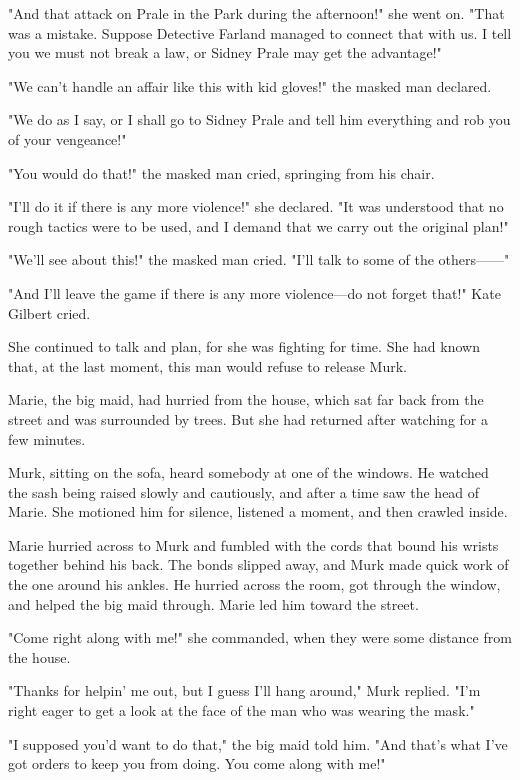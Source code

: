 \documentclass{novel}
\begin{document}
"And that attack on Prale in the Park during the afternoon!" she went on. "That was a mistake. Suppose Detective Farland managed to connect that with us. I tell you we must not break a law, or Sidney Prale may get the advantage!"

"We can't handle an affair like this with kid gloves!" the masked man declared.

"We do as I say, or I shall go to Sidney Prale and tell him everything and rob you of your vengeance!"

"You would do that!" the masked man cried, springing from his chair.

"I'll do it if there is any more violence!" she declared. "It was understood that no rough tactics were to be used, and I demand that we carry out the original plan!"

"We'll see about this!" the masked man cried. "I'll talk to some of the others------"

"And I'll leave the game if there is any more violence---do not forget that!" Kate Gilbert cried.

She continued to talk and plan, for she was fighting for time. She had known that, at the last moment, this man would refuse to release Murk.

Marie, the big maid, had hurried from the house, which sat far back from the street and was surrounded by trees. But she had returned after watching for a few minutes.

Murk, sitting on the sofa, heard somebody at one of the windows. He watched the sash being raised slowly and cautiously, and after a time saw the head of Marie. She motioned him for silence, listened a moment, and then crawled inside.

Marie hurried across to Murk and fumbled with the cords that bound his wrists together behind his back. The bonds slipped away, and Murk made quick work of the one around his ankles. He hurried across the room, got through the window, and helped the big maid through. Marie led him toward the street.

"Come right along with me!" she commanded, when they were some distance from the house.

"Thanks for helpin' me out, but I guess I'll hang around," Murk replied. "I'm right eager to get a look at the face of the man who was wearing the mask."

"I supposed you'd want to do that," the big maid told him. "And that's what I've got orders to keep you from doing. You come along with me!"
\end{document}
